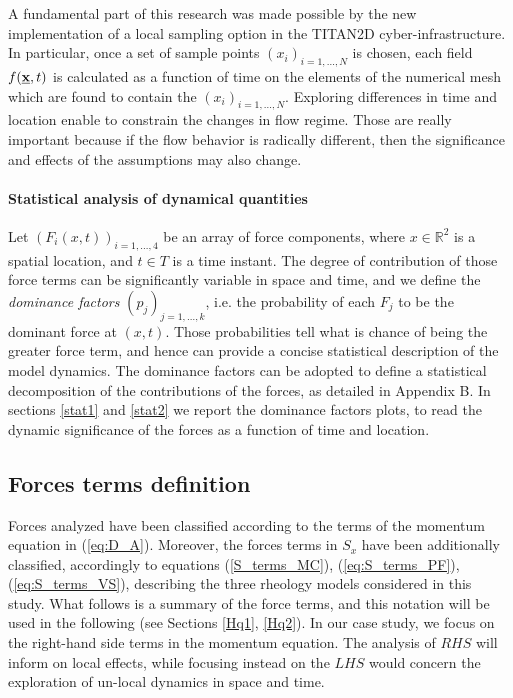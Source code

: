 \documentclass{article}
\begin{document}
A fundamental part of this research was made possible by the new implementation of a local sampling option in the TITAN2D cyber-infrastructure. In particular, once a set of sample points $(x_i)_{i=1,...,N}$ is chosen, each field $f(\underline{\textbf x},t)$ is calculated as a function of time on the elements of the numerical mesh which are found to contain the $(x_i)_{i=1,...,N}$. Exploring differences in time and location enable to constrain the changes in flow regime. Those are really important because if the flow behavior is radically different, then the significance and effects of the assumptions may also change.

\paragraph{Statistical analysis of dynamical quantities}
Let $(F_i(x,t))_{i=1,\dots, 4}$ be an array of force components, where $x\in\mathbb R^2$ is a spatial location, and $t\in T$ is a time instant. The degree of contribution of those force terms can be significantly variable in space and time, and we define the
\emph{dominance factors} $(p_j)_{j=1,\dots, k}$, i.e. the probability of each $F_j$ to be the dominant force at $(x,t)$. Those probabilities tell what is chance of being the greater force term, and hence can provide a concise statistical description of the model dynamics. The dominance factors can be adopted to define a statistical decomposition of the contributions of the forces, as detailed in Appendix B. In sections \ref{stat1} and \ref{stat2} we report the dominance factors plots, to read the dynamic significance of the forces as a function of time and location.

\subsection{Forces terms definition}\label{sec:Fterms}
Forces analyzed have been classified according to the terms of the momentum equation in (\ref{eq:D_A}). Moreover, the forces terms in $S_x$ have been additionally classified, accordingly to equations (\ref{S_terms_MC}), (\ref{eq:S_terms_PF}), (\ref{eq:S_terms_VS}), describing the three rheology models considered in this study. What follows is a summary of the force terms, and this notation will be used in the following (see Sections \ref{Hq1}, \ref{Hq2}). In our case study, we focus on the right-hand side terms in the momentum equation. The analysis of $RHS$ will inform on local effects, while focusing instead on the $LHS$ would concern the exploration of un-local dynamics in space and time.
\end{document}
